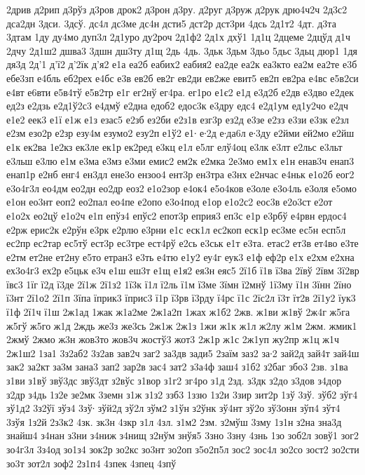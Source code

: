 {2дрив
д2рип
д3рўз
д3ров
дрок2
д3рон
д3ру.
д2руг
д3руж
д2рук
дрю4ч2ч
2д3с2
дса2дн
3дси.
3дсў.
дс4л
дс3ме
дс4н
дсти5
дст2р
дст3ри
4дсь
2д1т2
4дт.
д3та
3дтам
1ду
ду4мо
дуп3л
2д1уро
ду2роч
2д1ф2
2д1х
дхў1
1д1ц
2дцеме
2дцўд
д1ч
2дчу
2д1ш2
дшва3
3дшн
дш3ту
д1щ
2дь
4дь.
3дьк
3дьм
3дьо
5дьс
3дьц
дюр1
1дя
дя3д
2д'1
д'ї2
д'2їк
д'я2
е1а
еа2б
еабих2
еабия2
еа2де
еа2к
еа3кто
еа2м
еа2те
е3б
ебе3зп
е4бль
еб2рех
е4бс
е3в
ев2б
ев2г
ев2ди
ев2же
евит5
ев2п
ев2ра
е4вс
е5в2си
е4вт
е6вти
е5в4тў
е5в2тр
е1г
ег2нў
ег4ра.
ег1ро
е1є2
е1д
е3д2б
е2дв
е3дво
е2дек
ед2з
е2дзь
е2д1ў2с3
е4дмў
е2дна
едоб2
едос3к
е3дру
едс4
е2д1ум
ед1у2чо
е2дч
е1е2
еек3
е1ї
е1ж
е1з
езас5
е2зб
ез2би
е2з1в
езг3р
ез2д
е3зе
е2зз
е3зи
е3зк
е2зл
е2зм
езо2р
е2зр
езу4м
езумо2
езу2п
е1ў2
е1∙
е∙2д
е∙да6л
е∙3ду
е2йми
ей2мо
е2йш
е1к
ек2ва
1е2кз
ек3ле
ек1р
ек2ред
е3кц
е1л
е5лг
елў4оц
е3лк
е3лт
е2льс
е3льт
е3льш
е3лю
е1м
е3ма
е3мз
е3ми
емис2
ем2к
е2мка
2е3мо
ем1х
е1н
енав3ч
енап3
енап1р
е2нб
енг4
ен3дл
ене3о
ензоо4
ент3р
ен3тра
е3нх
е2нчас
е4ньк
е1о2б
еог2
е3о4г3л
ео4дм
ео2дн
ео2др
еоз2
е1о2зор
е4ок4
е5о4ков
е3оле
е3о4ль
е3оля
е5омо
е1он
ео3нт
еоп2
ео2пал
ео4пе
е2опо
е3о4под
е1ор
е1о2с2
еос3в
е2о3ст
е2от
е1о2х
ео2цў
е1о2ч
е1п
епўз4
епўс2
епот3р
еприя3
еп3с
е1р
е3рбў
е4рвн
ердос4
е2рж
ерис2к
е2рўн
е3рк
е2рлю
е3рни
е1с
еск1л
ес2коп
еск1р
ес3ме
ес5н
есп5л
ес2пр
ес2тар
ес5тў
ест3р
ес3тре
ест4рў
е2сь
е3ськ
е1т
е3та.
етас2
ет3в
ет4во
е3те
е2тм
ет2не
ет2ну
е5то
етран3
е3ть
е4тю
е1у2
еу4г
еук3
е1ф
еф2р
е1х
е2хм
е2хна
ех3о4г3
ех2р
е5цьк
е3ч
е1ш
еш3т
е1щ
е1я2
ея3н
еяс5
2ї1б
ї1в
ї3ва
2ївў
2ївм
3ї2вр
ївс3
1їг
ї2д
ї3де
2ї1ж
2ї1з2
1ї3к
ї1л
ї2ль
ї1м
ї3ме
3їмн
ї2мнў
1ї3му
ї1н
3їнн
2їно
ї3нт
2ї1о2
2ї1п
3їпа
їприк3
їприс3
ї1р
ї3рв
ї3рду
ї4рс
ї1с
2їс2л
ї3т
їт2в
2ї1у2
їук3
ї1ф
2ї1ч
ї1ш
2ж1ад
1жак
ж1а2ме
2ж1а2п
1жах
ж1б2
2жв.
ж1ви
ж1вў
2ж4г
ж5га
ж5гў
ж5го
ж1д
2ждь
же3з
же3сь
2ж1ж
2ж1з
1жи
ж1к
ж1л
ж2лу
ж1м
2жм.
жмик1
2жмў
2жмо
ж3н
жов3то
жов3ч
жостў3
жот3
2ж1р
ж1с
2ж1уп
жу2пр
ж1ц
ж1ч
2ж1ш2
1за1
3з2аб2
3з2ав
зав2ч
заг2
за3дв
зади5
2заїм
заз2
за∙2
зай2д
зай4т
зай4ш
зак2
за2кт
за3м
зана3
зап2
зар2в
зас4
зат2
з3а4ф
заш4
з1б2
з2баг
збо3
2зв.
з1ва
з1ви
з1вў
звў3дс
звў3дт
з2вўс
з1вор
з1г2
зг4ро
з1д
2зд.
з3дк
з2до
з3дов
з4дор
з2др
з4дь
1з2е
зе2мк
3земн
з1ж
з1з2
ззб3
1ззю
1з2и
3зир
зит2р
1зў
3зў.
зўб2
зўг4
зў1д2
3з2ўї
зўз4
3зў∙
зўй2д
зў2л
зўм2
з1ўн
з2ўнк
зў4нт
зў2о
зў3онн
зўп4
зўт4
3зўя
1з2й
2з3к2
4зк.
зк3н
4зкр
з1л
4зл.
з1м2
2зм.
з2мўш
3зму
1з1н
з2на
зна3д
знайш4
з4нан
з3ни
з4ниж
з4нищ
з2нўм
знўя5
3зно
3зну
4знь
1зо
зоб2л
зовў1
зог2
зо4г3л
3з4од
зо1з4
зок2р
зо2кс
зо3нт
зо2оп
з5о2п5л
зос2
зос4л
зо2со
зост2
зо2сти
зо3т
зот2л
зоф2
2з1п4
4зпек
4зпец
4зпў
}
